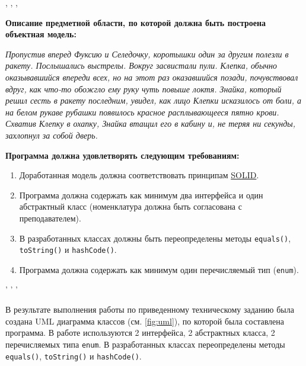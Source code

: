 \newpage
\Chapter{\lab\ \labnumber}{\labtheme}

\begin{center}
, , ,
\end{center}
\noindent
\textbf{
    Описание предметной области, по которой должна быть построена объектная модель:
}

\textit{
    Пропустив вперед Фуксию и Селедочку, коротышки один за другим полезли в ракету. Послышались выстрелы. Вокруг засвистали пули. Клепка, обычно оказывавшийся впереди всех, но на этот раз оказавшийся позади, почувствовал вдруг, как что-то обожгло ему руку чуть повыше локтя. Знайка, который решил сесть в ракету последним, увидел, как лицо Клепки исказилось от боли, а на белом рукаве рубашки появилось красное расплывающееся пятно крови. Схватив Клепку в охапку, Знайка втащил его в кабину и, не теряя ни секунды, захлопнул за собой дверь.\\
}

\noindent
\textbf{
    Программа должна удовлетворять следующим требованиям:
}
\begin{enumerate}
    \item Доработанная модель должна соответствовать принципам \href{https://en.wikipedia.org/wiki/SOLID}{SOLID}.
    \item Программа должна содержать как минимум два интерфейса и один абстрактный класс (номенклатура должна быть согласована с преподавателем).
    \item В разработанных классах должны быть переопределены методы \texttt{equals()}, \texttt{toString()} и \texttt{hashCode()}.
    \item Программа должна содержать как минимум один перечисляемый тип (\texttt{enum}).
\end{enumerate}
\begin{center}
    ' ' '
\end{center}

\newpage
{}
В результате выполнения работы по приведенному техническому заданию была создана UML диаграмма классов (см. \ref{fig:uml}), по которой была составлена программа. В работе используются 2 интерфейса, 2 абстрактных класса, 2 перечисляемых типа \texttt{enum}. В разработанных классах переопределены методы \texttt{equals()}, \texttt{toString()} и \texttt{hashCode()}.



